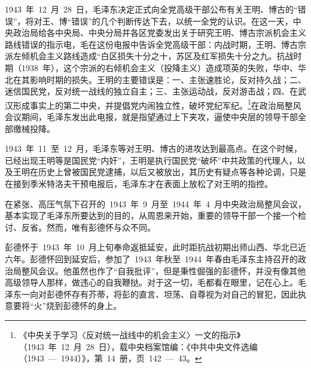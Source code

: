 1943~年~12~月~28~日，毛泽东决定正式向全党高级干部公布有关王明、博古的“错误”，将对王、博“错误”的几个判断传达下去，以统一全党的认识。在这一天，中央政治局给各中央局、中央分局并各区党委发出关于研究王明、博古宗派机会主义路线错误的指示电，毛在这份电报中告诉全党高级干部：内战时期，王明、博古宗派左倾机会主义路线造成“白区损失十分之十，苏区及红军损失十分之九。抗战时期（1938~年），这个宗派的右倾机会主义（投降主义）造成项英的失败，华中、华北在其影响时期的损失。王明的主要错误是：一、主张速胜论，反对持久战；二、迷信国民党，反对统一战线的独立自主；三、主张运动战，反对游击战；四、在武汉形成事实上的第二中央，并提倡党内闹独立性，破坏党纪军纪。\footnote{《中央关于学习〈反对统一战线中的机会主义〉一文的指示》（1943~年~12~月~28~日），载中央档案馆编：《中共中央文件选编（1943~—~1944）》，第~14~册，页~142~—~43。}在政治局整风会议期间，毛泽东发出此电报，就是指望通过上下夹攻，逼使中央层的领导干部全部缴械投降。

1943~年~11~至~12~月，毛泽东等对王明、博古的进攻达到最高点。在这个时候，已经出现王明等是国民党“内奸”，王明是执行国民党“破坏”中共政策的代理人，以及王明在历史上曾被国民党逮捕，以后又被放出，其历史有疑点等各种论调，只是在接到季米特洛夫干预电报后，毛泽东才在表面上放松了对王明的指控。

在紧张、高压气氛下召开的~1943~年~9~月至~1944~年~4~月中央政治局整风会议，基本实现了毛泽东所要达到的目的，从周恩来开始，重要的领导干部一个接一个检讨、反省。然而，唯有彭德怀与众不同。

彭德怀于~1943~年~10~月上旬奉命返抵延安，此时距抗战初期出师山西、华北已近六年。彭德怀回到延安后，参加了~1943~年秋至~1944~年春由毛泽东主持召开的政治局整风会议。他虽然也作了“自我批评”，但是秉性倔强的彭德怀，并没有像其他高级领导人那样，做违心的自我鞭挞。对于这一切，毛都看在眼里，记在心上。毛泽东一向对彭德怀存有芥蒂，将彭的直言、坦荡、自尊视为对自己的冒犯，因此执意要将“火”烧到彭德怀的身上。

